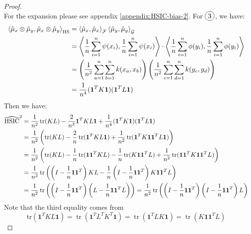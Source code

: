 \begin{proof}
\begin{equation*}
    \end{equation*}
    For the expansion please see appendix \ref{appendix:HSIC-bias-2}. For $\circled{3}$, we have:
    \begin{equation*}
    \begin{aligned}
        \left\langle  \hat{\mu}_x \otimes\hat{\mu}_y, \hat{\mu}_x\otimes\hat{\mu}_y \right\rangle_{\operatorname{HS}} &= \left\langle \hat{\mu}_x, \hat{\mu}_x \right\rangle_\mathcal{F}\left\langle \hat{\mu}_y, \hat{\mu}_y \right\rangle_\mathcal{G} \\
        &= \left\langle \frac{1}{n}\sum^n_{i=1}\psi(x_i),\frac{1}{n}\sum^n_{i=1}\psi(x_i) \right\rangle\cdot\left\langle \frac{1}{n}\sum^n_{i=1}\phi(y_i),\frac{1}{n}\sum^n_{i=1}\phi(y_i) \right\rangle \\
        &= \left( \frac{1}{n^2}\sum^n_{a=1}\sum^n_{b=1}k(x_a, x_b) \right)\left( \frac{1}{n^2}\sum^n_{c=1}\sum^n_{d=1}k(y_c, y_d) \right) \\
        &= \frac{1}{n^4}(\boldsymbol1^T K \boldsymbol1)(\boldsymbol 1^TL\boldsymbol 1)
    \end{aligned}
    \end{equation*}
    Then we have:
    \begin{equation*}
    \begin{aligned}
        \widehat{\operatorname{HSIC}}^2 &= \frac{1}{n^2}\operatorname{tr}(KL) - \frac{2}{n^3}\boldsymbol 1^TKL\boldsymbol 1 + \frac{1}{n^4}(\boldsymbol1^T K \boldsymbol1)(\boldsymbol 1^TL\boldsymbol 1) \\
        &= \frac{1}{n^2}\left(  \operatorname{tr}(KL) - \frac{2}{n}\operatorname{tr}(\boldsymbol1^TKL\boldsymbol1) + \frac{1}{n^2}\operatorname{tr}(\boldsymbol1^TK\boldsymbol1\boldsymbol1^TL\boldsymbol1)  \right) \\
        &= \frac{1}{n^2}\left(  \operatorname{tr}(KL) - \frac{1}{n}\operatorname{tr}(\boldsymbol1\boldsymbol1^TKL) - \frac{1}{n}\operatorname{tr}(K\boldsymbol1\boldsymbol1^TL) + \frac{1}{n^2}\operatorname{tr}(\boldsymbol1\boldsymbol1^TK\boldsymbol1\boldsymbol1^TL)  \right) \\
        &= \frac{1}{n^2}\operatorname{tr}\left( \left( I - \frac{1}{n}\boldsymbol1\boldsymbol1^T \right)KL - \frac{1}{n}\left( I - \frac{1}{n}\boldsymbol1\boldsymbol1^T \right)K\boldsymbol1\boldsymbol1^TL \right) \\
        &= \frac{1}{n^2}\operatorname{tr}\left( \left( I - \frac{1}{n}\boldsymbol1\boldsymbol1^T \right)\left( L - \frac{1}{n}\boldsymbol1\boldsymbol1^TL \right) \right) = \frac{1}{n^2}\operatorname{tr}\left( \left( I - \frac{1}{n}\boldsymbol1\boldsymbol1^T \right)\left( I - \frac{1}{n}\boldsymbol1\boldsymbol1^T \right)L \right) \\
    \end{aligned}
    \end{equation*}
    Note that the third equality comes from
    \begin{equation*}
        \text{tr}( \boldsymbol1^TKL\boldsymbol1) = \operatorname{tr}(\boldsymbol1^TL^TK^T\boldsymbol1) = \operatorname{tr}(\boldsymbol1^TLK\boldsymbol1) = \operatorname{tr}(K\boldsymbol1\boldsymbol1^TL)
    \end{equation*}
\end{proof}

